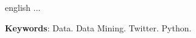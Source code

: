 \begin{resumo}[ABSTRACT]
 \begin{otherlanguage*}{english}
 ...
   
   \vspace{\onelineskip}
 
   \noindent 
   \textbf{Keywords}: Data. Data Mining. Twitter. Python.
 \end{otherlanguage*}
\end{resumo}
